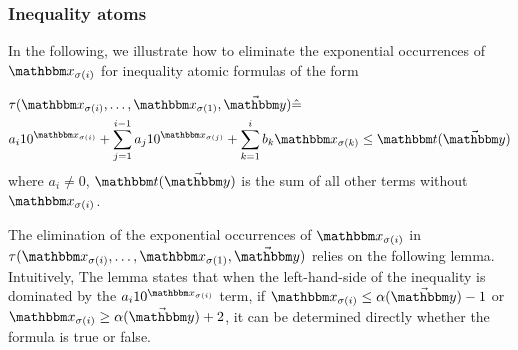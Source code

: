 \subsubsection{Inequality atoms}
In the following, we illustrate how to eliminate the exponential occurrences of $\ivarx_{\sigma(i)}$ for inequality atomic formulas of the form 

\vspace*{-2mm}

\begin{equation}\label{tau}
    \begin{aligned}
        &\tau(\ivarx_{\sigma(i)}, \ldots, \ivarx_{\sigma(1)}, \vec{\ivary}) \Def  \\
        &a_i 10^{\ivarx_{\sigma(i)}}+\sum_{j=1}^{i-1} a_j 10^{\ivarx_{\sigma(j)}} + \sum_{k=1}^{i}b_k \ivarx_{\sigma(k)} \le \iterm(\vec{\ivary})
    \end{aligned}            
\end{equation}
where $a_i\neq 0$, $\iterm(\vec \ivary)$ is the sum of all other terms without $\ivarx_{\sigma(i)}$.

The elimination of the exponential occurrences of $\ivarx_{\sigma(i)}$ in $\tau(\ivarx_{\sigma(i)}, \ldots, \ivarx_{\sigma(1)}, \vec{\ivary})$ relies on the following lemma. 
Intuitively, 
The lemma states that when the left-hand-side of the inequality is dominated by the $a_i 10^{\ivarx_{\sigma(i)}}$ term, if $\ivarx_{\sigma(i)}\le \alpha(\vec{\ivary})-1$ or $\ivarx_{\sigma(i)} \ge \alpha(\vec{\ivary})+2$, it can be determined directly whether the formula is true or false.

